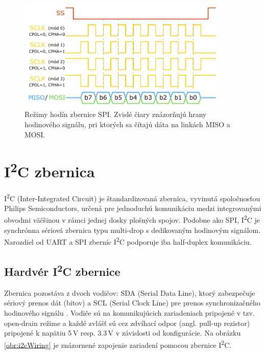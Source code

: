 \begin{figure}
    \centerline{\includegraphics[width=0.9\textwidth]{images/busses/spiClocks.pdf}}
    \caption[Režimy hodín zbernice SPI]{Režimy hodín zbernice SPI. Zvislé čiary znázorňujú hrany hodinového signálu, pri ktorých sa čítajú dáta na linkách MISO a MOSI.}
    \label{obr:spiModes}
\end{figure}

\section{I\textsuperscript{2}C zbernica}
I\textsuperscript{2}C (Inter-Integrated Circuit) je štandardizovaná zbernica, vyvinutá spoločnosťou Philips Semiconductors, určená pre jednoduchú komunikáciu medzi integrovanými obvodmi \cite{i2cSpec} väčšinou v rámci jednej dosky plošných spojov. Podobne ako SPI, I\textsuperscript{2}C je synchrónna sériová zbernica typu multi-drop s dedikovaným hodinovým signálom. Narozdiel od UART a SPI zberníc I\textsuperscript{2}C podporuje iba half-duplex komunikáciu.

\subsection{Hardvér I\textsuperscript{2}C zbernice}
Zbernica pozostáva z dvoch vodičov: SDA (Serial Data Line), ktorý zabezpečuje sériový prenos dát (bitov) a SCL (Serial Clock Line) pre prenos synchronizačného hodinového signálu \cite{i2cSpec}. Vodiče sú na komunikujúcich zariadeniach pripojené v tzv. open-drain režime a každé zvlášť sú cez zdvíhací odpor (angl. pull-up rezistor) pripojené k napätiu 5\,V resp. 3.3\,V v závislosti od konfigurácie. Na obrázku \ref{obr:i2cWiring} je znázornené zapojenie zariadení pomocou zbernice I\textsuperscript{2}C.

